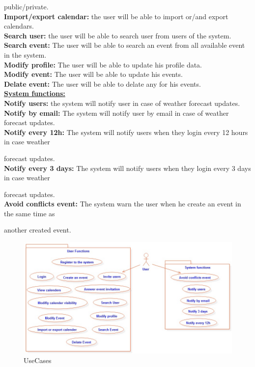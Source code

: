 public/private.\\

\textbf{Import/export calendar:} the user will be able to import or/and export calendars.\\

\textbf{Search user:} the user will be able to search user from users of the system.\\

\textbf{Search event:} The user will be able to search an event from all available event in the system.\\

\textbf{Modify profile:} The user will be able to update his profile data.\\

\textbf{Modify event:} The user will be able to update his events.\\

\textbf{Delate event:} The user will be able to delate any for his events.\\

\underline{\textbf{System functions:}}\\

\textbf{Notify users:} the system will notify user in case of weather forecast updates.\\

\textbf{Notify by email:} The system will notify user by email in case of weather forecast updates.\\

\textbf{Notify every 12h:} The system will notify users when they login every 12 hours in case weather

forecast updates.\\

\textbf{Notify every 3 days:} The system will notify users when they login every 3 days in case weather

forecast updates.\\

\textbf{Avoid conflicts event:} The system warn the user when he create an event in the same time as

another created event.\\
\newpage
\begin{figure}[tbh]
  \begin{center}
  \includegraphics[width=180mm]{usecases}
    \caption{UseCases}\label{Fig 1:}
  \end{center}
\end{figure}
\newpage
